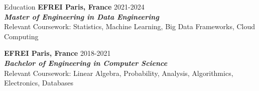 \documentclass[
	a4paper, %
	10pt, %
]{resume} %
\begin{document}
\begin{rSection}{Education}
	\textbf{EFREI Paris, France} \hfill 2021-2024 \\
	\textit{\textbf{Master of Engineering in Data Engineering}} \\
	Relevant Coursework: Statistics, Machine Learning, Big Data Frameworks, Cloud Computing

	\textbf{EFREI Paris, France} \hfill 2018-2021 \\
	\textit{\textbf{Bachelor of Engineering in Computer Science}} \\
	Relevant Coursework: Linear Algebra, Probability, Analysis, Algorithmics, Electronics, Databases
\end{rSection}

\end{document}
